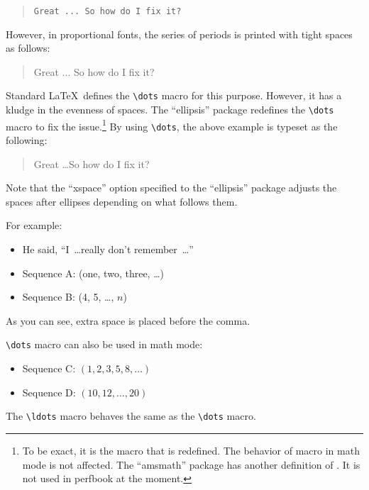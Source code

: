 \begin{quote}
  \verb|Great ... So how do I fix it?|
\end{quote}

However, in proportional fonts, the series of periods is printed
with tight spaces as follows:

\begin{quote}
  Great ... So how do I fix it?
\end{quote}

Standard \LaTeX\ defines the \verb|\dots| macro for this purpose.
However, it has a kludge in the evenness of spaces.
The ``ellipsis'' package redefines the \verb|\dots| macro to fix
the issue.\footnote{To be exact, it is the \co{\\textellipsis} macro
  that is redefined. The behavior of \co{\\dots} macro in math
  mode is not affected. The ``amsmath'' package has another definition
  of \co{\\dots}. It is not used in perfbook at the moment.}
By using \verb|\dots|, the above example is typeset as the following:

\begin{quote}
  Great \dots So how do I fix it?
\end{quote}

Note that the ``xspace'' option specified to the ``ellipsis'' package
adjusts the spaces after ellipses depending on what follows them.

For example:

\begin{itemize}[itemsep=.2ex]
\item He said, ``I~\dots really don't remember~\dots''
\item Sequence A: (one, two, three, \dots)
\item Sequence B: (4, 5, \dots, $n$)
\end{itemize}

As you can see, extra space is placed before the comma.

\verb|\dots| macro can also be used in math mode:

\begin{itemize}[itemsep=.2ex]
\item Sequence C: $(1, 2, 3, 5, 8, \dots)$
\item Sequence D: $(10, 12, \dots, 20)$
\end{itemize}

The \verb|\ldots| macro behaves the same as the \verb|\dots| macro.

